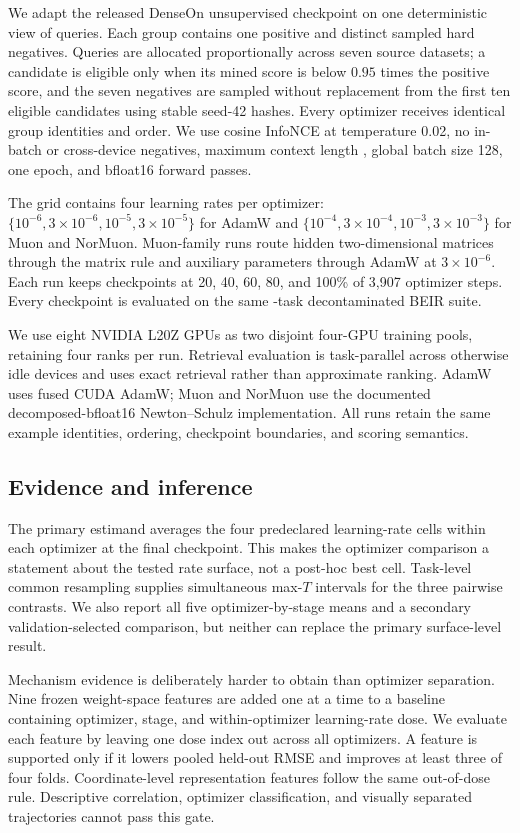 \documentclass[11pt]{article}
\begin{document}
We adapt the released DenseOn unsupervised checkpoint on one deterministic view of
\NumTrainingQueries{} queries. Each group contains one positive and \NumHardNegatives{} distinct
sampled hard negatives. Queries are allocated proportionally across seven source datasets; a
candidate is eligible only when its mined score is below $0.95$ times the positive score, and the
seven negatives are sampled without replacement from the first ten eligible candidates using
stable seed-42 hashes. Every optimizer receives identical group identities and order. We use cosine
InfoNCE at temperature 0.02, no in-batch or cross-device negatives, maximum context length
\ContextLength{}, global batch size 128, one epoch, and bfloat16 forward passes.

The grid contains four learning rates per optimizer: $\{10^{-6},3\!\times\!10^{-6},10^{-5},
3\!\times\!10^{-5}\}$ for AdamW and $\{10^{-4},3\!\times\!10^{-4},10^{-3},3\!\times\!10^{-3}\}$
for Muon and NorMuon. Muon-family runs route hidden two-dimensional matrices through the matrix
rule and auxiliary parameters through AdamW at $3\!\times\!10^{-6}$. Each run keeps checkpoints at
20, 40, 60, 80, and 100\% of 3,907 optimizer steps. Every checkpoint is evaluated on the same
\NumBEIRTasks-task decontaminated BEIR suite.

We use eight NVIDIA L20Z GPUs as two disjoint four-GPU training pools, retaining four ranks per
run. Retrieval evaluation is task-parallel across otherwise idle devices and uses exact retrieval
rather than approximate ranking. AdamW uses fused CUDA AdamW; Muon and NorMuon use the documented
decomposed-bfloat16 Newton--Schulz implementation. All runs retain the same example identities,
ordering, checkpoint boundaries, and scoring semantics.

\subsection{Evidence and inference}

The primary estimand averages the four predeclared learning-rate cells within each optimizer at the
final checkpoint. This makes the optimizer comparison a statement about the tested rate surface,
not a post-hoc best cell. Task-level common resampling supplies simultaneous max-$T$ intervals for
the three pairwise contrasts. We also report all five optimizer-by-stage means and a secondary
validation-selected comparison, but neither can replace the primary surface-level result.

Mechanism evidence is deliberately harder to obtain than optimizer separation. Nine frozen
weight-space features are added one at a time to a baseline containing optimizer, stage, and
within-optimizer learning-rate dose. We evaluate each feature by leaving one dose index out across
all optimizers. A feature is supported only if it lowers pooled held-out RMSE and improves at least
three of four folds. Coordinate-level representation features follow the same out-of-dose rule.
Descriptive correlation, optimizer classification, and visually separated trajectories cannot pass
this gate.
\end{document}
